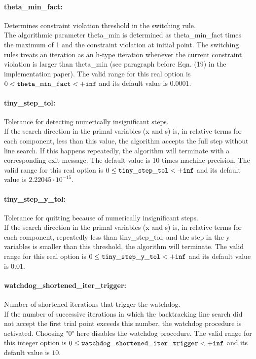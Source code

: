 \paragraph{theta\_min\_fact:}\label{sec:theta_min_fact} Determines constraint violation threshold in the switching rule. $\;$ \\
 The algorithmic parameter theta\_min is
determined as theta\_min\_fact times the maximum
of 1 and the constraint violation at initial
point.  The switching rules treats an iteration
as an h-type iteration whenever the current
constraint violation is larger than theta\_min
(see paragraph before Eqn. (19) in the
implementation paper). The valid range for this real option is 
$0 <  {\tt theta\_min\_fact } <  {\tt +inf}$
and its default value is $0.0001$.


\paragraph{tiny\_step\_tol:}\label{sec:tiny_step_tol} Tolerance for detecting numerically insignificant steps. $\;$ \\
 If the search direction in the primal variables
(x and s) is, in relative terms for each
component, less than this value, the algorithm
accepts the full step without line search.  If
this happens repeatedly, the algorithm will
terminate with a corresponding exit message. The
default value is 10 times machine precision. The valid range for this real option is 
$0 \le {\tt tiny\_step\_tol } <  {\tt +inf}$
and its default value is $2.22045 \cdot 10^{-15}$.


\paragraph{tiny\_step\_y\_tol:}\label{sec:tiny_step_y_tol} Tolerance for quitting because of numerically insignificant steps. $\;$ \\
 If the search direction in the primal variables
(x and s) is, in relative terms for each
component, repeatedly less than tiny\_step\_tol,
and the step in the y variables is smaller than
this threshold, the algorithm will terminate. The valid range for this real option is 
$0 \le {\tt tiny\_step\_y\_tol } <  {\tt +inf}$
and its default value is $0.01$.


\paragraph{watchdog\_shortened\_iter\_trigger:}\label{sec:watchdog_shortened_iter_trigger} Number of shortened iterations that trigger the watchdog. $\;$ \\
 If the number of successive iterations in which
the backtracking line search did not accept the
first trial point exceeds this number, the
watchdog procedure is activated.  Choosing "0"
here disables the watchdog procedure. The valid range for this integer option is
$0 \le {\tt watchdog\_shortened\_iter\_trigger } <  {\tt +inf}$
and its default value is $10$.



